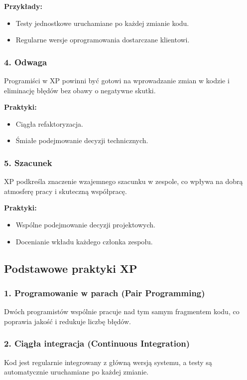 \textbf{Przykłady:}
\begin{itemize}
    \item Testy jednostkowe uruchamiane po każdej zmianie kodu.
    \item Regularne wersje oprogramowania dostarczane klientowi.
\end{itemize}

\subsubsection{4. Odwaga}
Programiści w XP powinni być gotowi na wprowadzanie zmian w kodzie i eliminację błędów bez obawy o negatywne skutki.

\textbf{Praktyki:}
\begin{itemize}
    \item Ciągła refaktoryzacja.
    \item Śmiałe podejmowanie decyzji technicznych.
\end{itemize}

\subsubsection{5. Szacunek}
XP podkreśla znaczenie wzajemnego szacunku w zespole, co wpływa na dobrą atmosferę pracy i skuteczną współpracę.

\textbf{Praktyki:}
\begin{itemize}
    \item Wspólne podejmowanie decyzji projektowych.
    \item Docenianie wkładu każdego członka zespołu.
\end{itemize}

\subsection{Podstawowe praktyki XP}

\subsubsection{1. Programowanie w parach (Pair Programming)}
Dwóch programistów wspólnie pracuje nad tym samym fragmentem kodu, co poprawia jakość i redukuje liczbę błędów.

\subsubsection{2. Ciągła integracja (Continuous Integration)}
Kod jest regularnie integrowany z główną wersją systemu, a testy są automatycznie uruchamiane po każdej zmianie.

